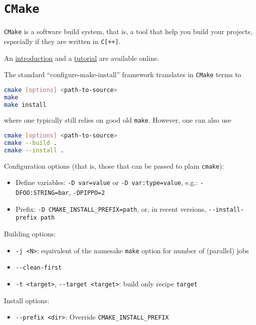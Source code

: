 \documentclass[a4paper,12pt,%
              final%
              ]{article}
\begin{document}
\section{\texttt{CMake}}
\verb|CMake| is a software build system, that is, a tool that help you build your projects, especially if they are written in \verb|C[++]|.

An \href{https://cmake.org/cmake/help/latest/manual/cmake.1.html}{introduction} and a \href{https://cmake.org/cmake/help/latest/guide/tutorial/index.html}{tutorial} are available online.

The standard ``configure-make-install'' framework translates in \verb|CMake| terms to
\begin{lstlisting}[language=bash]
cmake [options] <path-to-source>
make
make install
\end{lstlisting}
where one typically still relies on good old \texttt{make}. However, one can also use
\begin{lstlisting}[language=bash]
cmake [options] <path-to-source>
cmake --build .
cmake --install .
\end{lstlisting}

Configuration options (that is, those that can be passed to plain \texttt{cmake}):
\begin{itemize}
  \item Define variables: \verb|-D var=value| or \verb|-D var:type=value|, e.g.: \verb|-DFOO:STRING=bar|, \verb|-DPIPPO=2|
  \item Prefix: \verb|-D CMAKE_INSTALL_PREFIX=path|, or, in recent versions, \verb|--install-prefix path|
\end{itemize}

Building options:
\begin{itemize}
  \item \verb|-j <N>|: equivalent of the namesake \texttt{make} option for number of (parallel) jobs
  \item \verb|--clean-first|
  \item \verb|-t <target>|, \verb|--target <target>|: build only recipe \verb|target|
\end{itemize}

Install options:
\begin{itemize}
  \item \verb|--prefix <dir>|: Override \verb|CMAKE_INSTALL_PREFIX|
\end{itemize}
\end{document}
